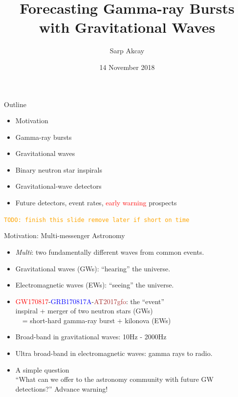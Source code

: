 \documentclass[xcolor=dvipsnames,handout,t]{beamer}
\title[] %
\title[Forecasting GRBs w/ GWs] %
{Forecasting Gamma-ray Bursts with Gravitational Waves}
\subtitle{\todo{Add background image}} %
\author[Sarp Akcay]{Sarp Akcay\inst{1}\inst{2} }
\institute[FSU Jena - UCD] %
{
  \inst{1}%
  FSU Jena %
  \inst{2}%
  University College Dublin
  }
\date[Sabanci University]{14 November 2018}
\newcommand{\todo}[1]{\textcolor{orange}{\texttt{TODO: #1}}}
\newcommand{\red}[1]{\textcolor{red}{#1}}
\newcommand{\bl}[1]{\textcolor{blue}{#1}}
\begin{document}
\begin{frame}
 \titlepage
\end{frame}

\begin{frame}{Outline}
\begin{itemize}
 \item Motivation
 \item Gamma-ray bursts
 \item Gravitational waves
 \item Binary neutron star inspirals
 \item Gravitational-wave detectors
 \item Future detectors, event rates, \red{early warning} prospects
\end{itemize}
\todo{finish this slide remove later if short on time}

 
\end{frame}


\begin{frame}{Motivation: Multi-messenger Astronomy}
  \begin{itemize}
    \item \emph{Multi}: two fundamentally different waves from common events.
    \item[]\quad Gravitational waves (GWs): ``hearing''  the universe.
    \item[]\quad Electromagnetic waves (EWs): ``seeing'' the universe.
    \item \red{GW170817}-\bl{GRB170817A}-\textcolor{brown}{AT2017gfo}: the ``event'' \\
    \quad inspiral + merger of two neutron stars (GWs) \\
    \ \ = short-hard gamma-ray burst + kilonova (EWs)
    \item[] Broad-band in gravitational waves: 10Hz - 2000Hz
    \item[] Ultra broad-band in electromagnetic waves: gamma rays to radio.
    \item A simple question \\
    {\small ``What can we offer to the astronomy community with future GW detections?''}
    Advance warning!
  \end{itemize}
\end{frame}
\end{document}
